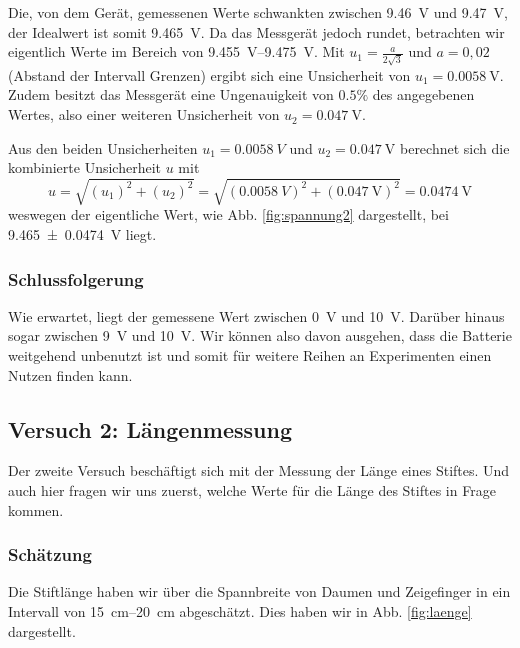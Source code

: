 \documentclass[11pt,a4paper,titlepage, ngerman]{article}
\begin{document}
				Die, von dem Gerät, gemessenen Werte schwankten zwischen \SI{9,46}{\V} und \SI{9,47}{\V}, der Idealwert ist somit \SI{9,465}{\V}. Da das Messgerät jedoch rundet, betrachten wir eigentlich Werte im Bereich von \SIrange{9,455}{9,475}{\V}. Mit $u_1 =  \frac{a}{2\sqrt{3} }$ und $a=0,02$ (Abstand der Intervall Grenzen) ergibt sich eine Unsicherheit von $u_1 = \SI{0,0058}{\V}$.
				Zudem besitzt das Messgerät eine Ungenauigkeit von $0.5\%$ des angegebenen Wertes, also einer weiteren Unsicherheit von  $u_2 = \SI{0,047}{\V}$. 
				 	
				Aus den beiden Unsicherheiten $u_1=\SI{0,0058}{V}$ und $u_2= \SI{0,047}{\V}$ berechnet sich die kombinierte Unsicherheit $u$ mit
				\begin{equation*}
					u = \sqrt{\left( u_1 \right)^2 + \left( u_2 \right)^2}
					= \sqrt{\left( \SI{0,0058}{V} \right)^2 + \left( \SI{0,047}{\V} \right)^2}
					= \SI{0,0474}{\V}
				\end{equation*}
				weswegen der eigentliche Wert, wie Abb. \ref{fig:spannung2} dargestellt, bei \SI{9,465 \pm 0,0474}{\V}  liegt.
			
			\subsubsection{Schlussfolgerung}
				
				Wie erwartet, liegt der gemessene Wert zwischen \SI{0}{\V} und \SI{10}{\V}. Darüber hinaus sogar zwischen \SI{9}{\V} und \SI{10}{\V}. Wir können also davon ausgehen, dass die Batterie weitgehend unbenutzt ist und somit für weitere Reihen an Experimenten einen Nutzen finden kann.
									
		\subsection{Versuch 2: Längenmessung}
			\label{2.2}	
			
			Der zweite Versuch beschäftigt sich mit der Messung der Länge eines Stiftes. Und auch hier fragen wir uns zuerst, welche Werte für die Länge des Stiftes in Frage kommen.
			
			\subsubsection{Schätzung}
				\label{2.2.1}	
				
				Die Stiftlänge haben wir über die Spannbreite von Daumen und Zeigefinger in ein Intervall von \SIrange{15}{20}{\cm} abgeschätzt. Dies haben wir in Abb. \ref{fig:laenge} dargestellt.
				
\end{document}
